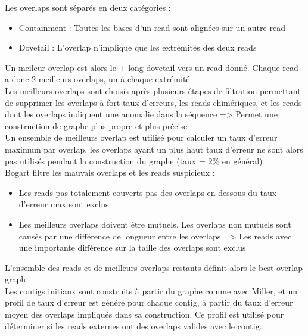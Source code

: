 \documentclass[12pt]{article}
\begin{document}
Les overlaps sont séparés en deux catégories : \\

\begin{itemize}
	\item Containment : Toutes les bases d'un read sont alignées sur un autre read
	\item Dovetail : L'overlap n'implique que les extrémités des deux reads
\end{itemize}

Un meileur overlap est alors le + long dovetail vers un read donné. Chaque read a donc 2 meilleurs overlaps, un à chaque extrémité \\

Les meilleurs overlaps sont choisis après plusieurs étapes de filtration permettant de supprimer les overlaps à fort taux d'erreurs,  les reads chimériques, et les reads dont les overlaps indiquent une anomalie dans la séquence => Permet une construction de graphe plus propre et plus précise \\

Un ensemble de meilleurs overlap est utilisé pour calculer un taux d'erreur maximum par overlap, les overlaps ayant un plus haut taux d'erreur ne sont alors pas utilisés pendant la construction du graphe (taux = 2\% en général) \\

Bogart filtre les mauvais overlaps et les reads suspicieux : \\

\begin{itemize}
	\item Les reads pas totalement couverts pas des overlaps en dessous du taux d'erreur max sont exclus
	\item Les meilleurs overlaps doivent être mutuels. Les overlaps non mutuels sont causés par une différence de longueur entre les overlaps
		  => Les reads avec une importante différence sur la taille des overlaps sont exclus
\end{itemize}

L'ensemble des reads et de meilleurs overlaps restants définit alors le best overlap graph \\

Les contigs initiaux sont construits à partir du graphe comme avec Miller, et un profil de taux d'erreur est généré pour chaque contig, à partir du taux 
d'erreur moyen des overlaps impliqués dans sa construction. Ce profil est utilisé pour déterminer si les reads externes ont des overlaps valides
avec le contig. \\
\end{document}

